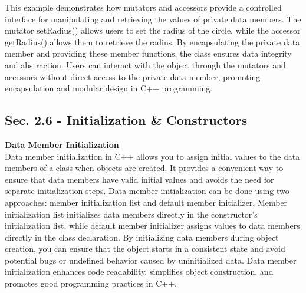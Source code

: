 \begin{solution}
    \noindent This example demonstrates how mutators and accessors provide a controlled interface for manipulating and retrieving the values of private data members. The mutator setRadius() allows users to set the radius 
    of the circle, while the accessor getRadius() allows them to retrieve the radius. By encapsulating the private data member and providing these member functions, the class ensures data integrity and abstraction. Users 
    can interact with the object through the mutators and accessors without direct access to the private data member, promoting encapsulation and modular design in C++ programming. \\
\end{solution}

\subsection{Sec. 2.6 - Initialization \& Constructors}
\noindent \textbf{Data Member Initialization} \\

Data member initialization in C++ allows you to assign initial values to the data members of a class when objects are created. It provides a convenient way to ensure that data members have valid initial values and avoids 
the need for separate initialization steps. Data member initialization can be done using two approaches: member initialization list and default member initializer. Member initialization list initializes data members directly 
in the constructor's initialization list, while default member initializer assigns values to data members directly in the class declaration. By initializing data members during object creation, you can ensure that the object 
starts in a consistent state and avoid potential bugs or undefined behavior caused by uninitialized data. Data member initialization enhances code readability, simplifies object construction, and promotes good programming 
practices in C++. \\


